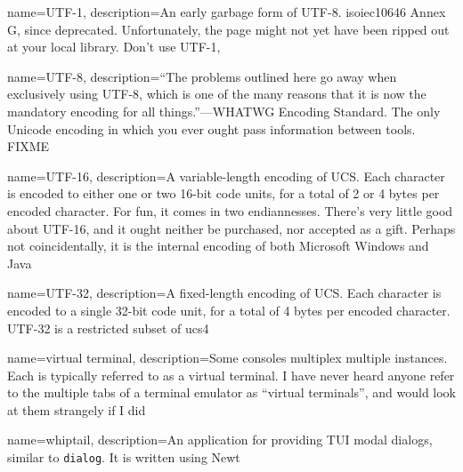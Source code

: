 {
  name={UTF-1},
description={An early garbage form of UTF-8. \Gls{isoiec10646} Annex G, since deprecated.
  Unfortunately, the page might not yet have been ripped out at your local
  library. Don't use UTF-1},
}

{
  name={UTF-8},
description={``The problems outlined here go away when exclusively using UTF-8,
  which is one of the many reasons that it is now the mandatory encoding for
  all things.''---WHATWG Encoding Standard\cite{whatwg}. The only Unicode
  encoding in which you ever ought pass information between
  tools\cite{utf8everywhere}. FIXME}
}

{
  name={UTF-16},
description={A variable-length encoding of UCS. Each character is encoded to
  either one or two 16-bit code units, for a total of 2 or 4 bytes per
  encoded character. For fun, it comes in two endiannesses. There's very little
  good about UTF-16, and it ought neither be purchased, nor accepted as a gift.
  Perhaps not coincidentally, it is the internal encoding of both Microsoft
  Windows and Java}
}

{
  name={UTF-32},
description={A fixed-length encoding of UCS. Each character is encoded to a
  single 32-bit code unit, for a total of 4 bytes per encoded character. UTF-32
  is a restricted subset of \Gls{ucs4}\cite{rfc3629}}
}

{
  name={virtual terminal},
description={Some consoles multiplex multiple instances. Each is
  typically referred to as a virtual terminal. I have never heard anyone
  refer to the multiple tabs of a terminal emulator as ``virtual terminals'',
  and would look at them strangely if I did}
}

{
  name={whiptail},
description={An application for providing TUI modal dialogs, similar to \texttt{dialog}. It is written using Newt}
}

